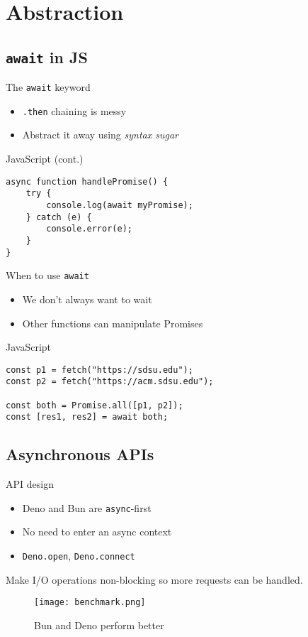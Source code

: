 \documentclass{beamer}
\begin{document}
\section{Abstraction}

\subsection{\texttt{await} in JS}

\begin{frame}[fragile]{The \texttt{await} keyword}
	\begin{itemize}
		\item \texttt{.then} chaining is messy
		\item Abstract it away using \emph{syntax sugar}
	\end{itemize}
\begin{block}{JavaScript (cont.)}
\begin{verbatim}
async function handlePromise() {
	try {
		console.log(await myPromise);
	} catch (e) {
		console.error(e);
	}
}
\end{verbatim}
\end{block}
\end{frame}

\begin{frame}[fragile]{When to use \texttt{await}}
	\begin{itemize}
		\item We don't always want to wait
		\item Other functions can manipulate Promises
	\end{itemize}
\begin{block}{JavaScript}
\begin{verbatim}
const p1 = fetch("https://sdsu.edu");
const p2 = fetch("https://acm.sdsu.edu");

const both = Promise.all([p1, p2]);
const [res1, res2] = await both;
\end{verbatim}
\end{block}
\end{frame}

\subsection{Asynchronous APIs}

\begin{frame}{API design}
	\begin{itemize}
		\item Deno and Bun are \texttt{async}-first
		\item No need to enter an async context
		\item \texttt{Deno.open}, \texttt{Deno.connect}
	\end{itemize}
	Make I/O operations \alert{non-blocking} so more requests can be
	handled.

	\begin{figure}[ht]
		\centering
		\texttt{[image: benchmark.png]}
		\caption{Bun and Deno perform better}
	\end{figure}
\end{frame}
\end{document}
